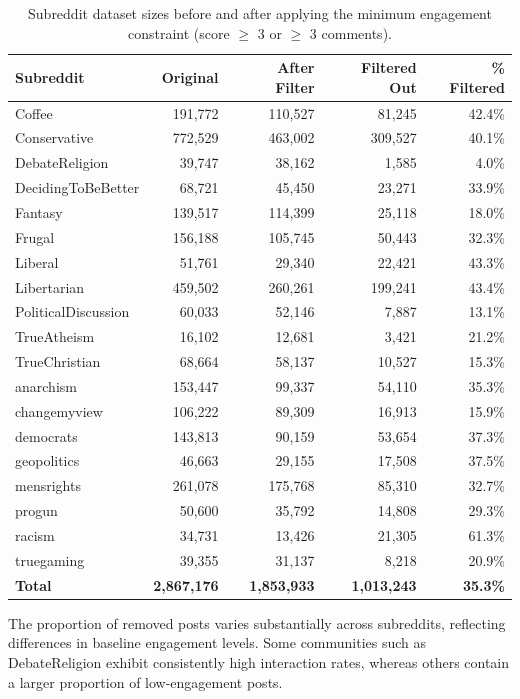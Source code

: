 \begin{table}[htbp]
\centering
\caption{Subreddit dataset sizes before and after applying the minimum engagement constraint (score $\geq$ 3 or $\geq$ 3 comments).}
\label{tab:subreddit_filtering_engagement}
\begin{tabular}{lrrrr}
\toprule
\textbf{Subreddit} & \textbf{Original} & \textbf{After Filter} & \textbf{Filtered Out} & \textbf{\% Filtered} \\
\midrule
Coffee              & 191,772 & 110,527 &  81,245 & 42.4\% \\
Conservative        & 772,529 & 463,002 & 309,527 & 40.1\% \\
DebateReligion      &  39,747 &  38,162 &   1,585 &  4.0\% \\
DecidingToBeBetter  &  68,721 &  45,450 &  23,271 & 33.9\% \\
Fantasy             & 139,517 & 114,399 &  25,118 & 18.0\% \\
Frugal              & 156,188 & 105,745 &  50,443 & 32.3\% \\
Liberal             &  51,761 &  29,340 &  22,421 & 43.3\% \\
Libertarian         & 459,502 & 260,261 & 199,241 & 43.4\% \\
PoliticalDiscussion &  60,033 &  52,146 &   7,887 & 13.1\% \\
TrueAtheism         &  16,102 &  12,681 &   3,421 & 21.2\% \\
TrueChristian       &  68,664 &  58,137 &  10,527 & 15.3\% \\
anarchism           & 153,447 &  99,337 &  54,110 & 35.3\% \\
changemyview        & 106,222 &  89,309 &  16,913 & 15.9\% \\
democrats           & 143,813 &  90,159 &  53,654 & 37.3\% \\
geopolitics         &  46,663 &  29,155 &  17,508 & 37.5\% \\
mensrights          & 261,078 & 175,768 &  85,310 & 32.7\% \\
progun              &  50,600 &  35,792 &  14,808 & 29.3\% \\
racism              &  34,731 &  13,426 &  21,305 & 61.3\% \\
truegaming          &  39,355 &  31,137 &   8,218 & 20.9\% \\
\midrule
\textbf{Total}      & \textbf{2,867,176} & \textbf{1,853,933} & \textbf{1,013,243} & \textbf{35.3\%} \\
\bottomrule
\end{tabular}
\end{table}

The proportion of removed posts varies substantially across subreddits, reflecting differences in baseline engagement levels. Some communities such as DebateReligion exhibit consistently high interaction rates, whereas others contain a larger proportion of low-engagement posts.